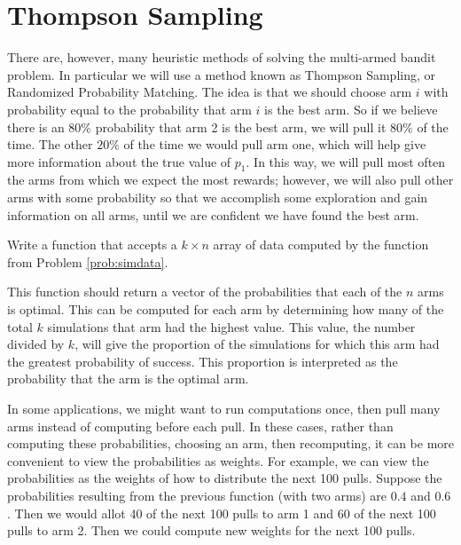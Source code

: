 \section*{Thompson Sampling}

There are, however, many heuristic methods of solving the multi-armed bandit problem.
In particular we will use a method known as Thompson Sampling, or Randomized Probability Matching.
The idea is that we should choose arm $i$ with probability equal to the probability
that arm $i$ is the best arm.  So if we believe there is an $80\%$ probability that
arm 2 is the best arm, we will pull it $80\%$ of the time.  The other $20\%$ of the
time we would pull arm one, which will help give more information about the true value of $p_1$.
In this way, we will pull most often the arms from which we expect the most rewards;
however, we will also pull other arms with some probability so that we accomplish some
exploration and gain information on all arms, until we are confident we have found the best arm.

\begin{problem}
Write a function  that accepts a $k \times n$ array of data computed by the
function from Problem \ref{prob:simdata}.

This function should return a vector of the probabilities that each of the $n$ arms is optimal.
This can be computed for each arm by determining how many of the total $k$ simulations
that arm had the highest value.  This value, the number divided by $k$, will give the proportion
of the simulations for which this arm had the greatest probability of success.
This proportion is interpreted as the probability that the arm is the optimal arm.
\end{problem}

In some applications, we might want to run computations once, then pull many arms instead
of computing before each pull.  In these cases, rather than computing these probabilities,
choosing an arm, then recomputing, it can be more convenient to view the probabilities as weights.
For example, we can view the probabilities as the weights of how to distribute the next 100 pulls.
Suppose the probabilities resulting from the previous function (with two arms) are $0.4$ and $0.6$.
Then we would allot 40 of the next 100 pulls to arm 1 and 60 of the next 100 pulls to arm 2.
Then we could compute new weights for the next 100 pulls.

